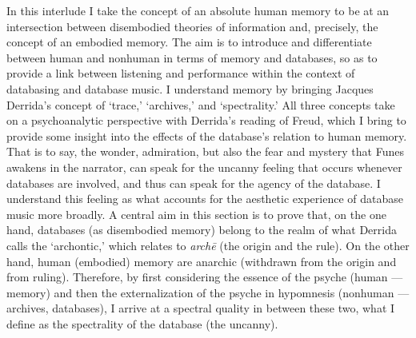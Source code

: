 In this interlude I take the concept of an absolute human memory to be at an intersection between disembodied theories of information and, precisely, the concept of an embodied memory. The aim is to introduce and differentiate between human and nonhuman in terms of memory and databases, so as to provide a link between listening  and performance  within the context of databasing and database music. I understand memory by bringing Jacques Derrida's concept of `trace,' `archives,' and `spectrality.' All three concepts take on a psychoanalytic perspective with Derrida's reading of Freud, which I bring to provide some insight into the effects of the database's relation to human memory. That is to say, the wonder, admiration, but also the fear and mystery that Funes awakens in the narrator, can speak for the uncanny feeling that occurs whenever databases are involved, and thus can speak for the agency of the database. I understand this feeling as what accounts for the aesthetic experience of database music more broadly. A central aim in this section is to prove that, on the one hand, databases (as disembodied memory) belong to the realm of what Derrida calls the `archontic,' which relates to \textit{archē} (the origin and the rule). On the other hand, human (embodied) memory are anarchic (withdrawn from the origin and from ruling). Therefore, by first considering the essence of the psyche (human --- memory) and then the externalization of the psyche in hypomnesis (nonhuman --- archives, databases), I arrive at a spectral quality in between these two, what I define as the spectrality of the database (the uncanny).

